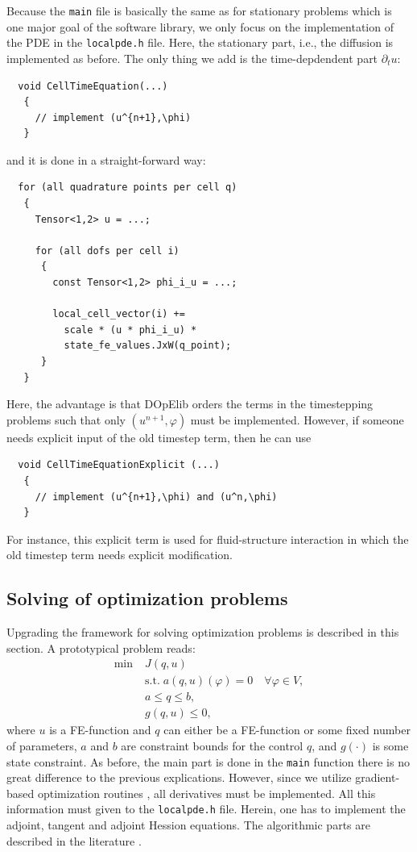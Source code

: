 \documentclass[prodmode,acmtoms]{acmsmall}
\numberwithin{equation}{section}
\renewcommand{\phi}{\varphi}
\begin{document}
Because the \texttt{main} file 
is basically the same as for stationary problems
which is one major goal of the software library,
we only focus on the implementation of the PDE in the 
\texttt{localpde.h} file. Here, the stationary part, i.e.,
the diffusion is implemented as before. The only thing we add 
is the time-depdendent part $\partial_t u$:

\begin{lstlisting}
  void CellTimeEquation(...)
   {
     // implement (u^{n+1},\phi) 
   }
\end{lstlisting}
and it is done in a straight-forward way:
\begin{lstlisting}
  for (all quadrature points per cell q)
   {
     Tensor<1,2> u = ...;

     for (all dofs per cell i)
      {
        const Tensor<1,2> phi_i_u = ...;

        local_cell_vector(i) +=  
          scale * (u * phi_i_u) * 
          state_fe_values.JxW(q_point);
      }
   }
\end{lstlisting}
Here, the advantage is that DOpElib orders the terms in the timestepping
problems
such that only $(u^{n+1},\phi)$ must be implemented. However, if someone 
needs explicit input of the old timestep term, then he can use 
\begin{lstlisting}
  void CellTimeEquationExplicit (...)
   {
     // implement (u^{n+1},\phi) and (u^n,\phi)  
   }
\end{lstlisting}
For instance, this explicit term is used for fluid-structure interaction in
which
the old timestep term needs explicit modification.   





\subsection{Solving of optimization problems}
Upgrading the framework for solving optimization problems
is described in this section. A prototypical problem reads:
\begin{align*}
\min\;&J(q,u) \\
  &\text{s.t.}\; a(q,u)(\phi) = 0 \quad \forall \phi\in V,\\
  &a \le q \le b,\\
  &g(q,u) \le 0,  
\end{align*}
where $u$ is a FE-function and $q$ can either be a FE-function or some 
fixed number of parameters, $a$ and $b$ are constraint bounds for the control $q$,
and $g(\cdot)$ is some state constraint.
As before, the main part is done in the \texttt{main} function there is no
great difference to the previous explications. However, 
since we utilize gradient-based optimization routines \cite{...},
all derivatives must be implemented. All this information
must given to the \texttt{localpde.h} file. Herein, one has to 
implement the adjoint, tangent and adjoint Hession equations. 
The algorithmic parts are described in the literature \cite{BeMeVe06}.
\end{document}
